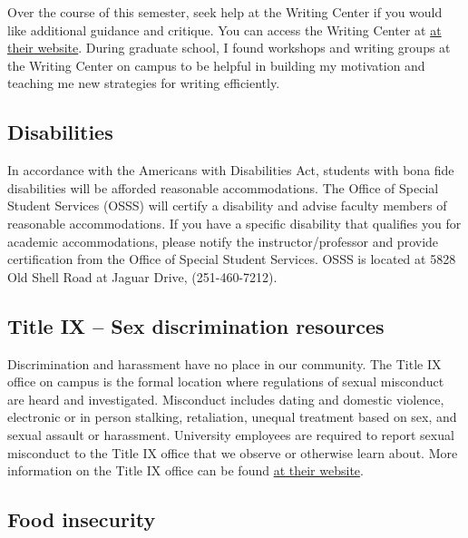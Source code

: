 \documentclass[11pt,]{article}
\begin{document}
Over the course of this semester, seek help at the Writing Center if you
would like additional guidance and critique. You can access the Writing
Center at
\href{https://www.southalabama.edu/departments/academicsuccess/cae/how.it.works.html}{at
their website}. During graduate school, I found workshops and writing
groups at the Writing Center on campus to be helpful in building my
motivation and teaching me new strategies for writing efficiently.

\hypertarget{disabilities}{%
\subsection{Disabilities}\label{disabilities}}

In accordance with the Americans with Disabilities Act, students with
bona fide disabilities will be afforded reasonable accommodations. The
Office of Special Student Services (OSSS) will certify a disability and
advise faculty members of reasonable accommodations. If you have a
specific disability that qualifies you for academic accommodations,
please notify the instructor/professor and provide certification from
the Office of Special Student Services. OSSS is located at 5828 Old
Shell Road at Jaguar Drive, (251-460-7212).

\hypertarget{title-ix-sex-discrimination-resources}{%
\subsection{Title IX -- Sex discrimination
resources}\label{title-ix-sex-discrimination-resources}}

Discrimination and harassment have no place in our community. The Title
IX office on campus is the formal location where regulations of sexual
misconduct are heard and investigated. Misconduct includes dating and
domestic violence, electronic or in person stalking, retaliation,
unequal treatment based on sex, and sexual assault or harassment.
University employees are required to report sexual misconduct to the
Title IX office that we observe or otherwise learn about. More
information on the Title IX office can be found
\href{https://www.southalabama.edu/departments/studentaffairs/titlenine/}{at
their website}.

\hypertarget{food-insecurity}{%
\subsection{Food insecurity}\label{food-insecurity}}
\end{document}
